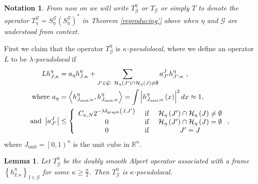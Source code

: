 \documentclass{amsart}%
\theoremstyle{plain}
\newtheorem{lemma}[theorem]{Lemma}
\newtheorem{notation}[theorem]{Notation}
\numberwithin{equation}{section}
\begin{document}
\begin{notation}
From now on we will write $T_{\mathcal{G}}^{\eta}$ or $T_{\mathcal{G}}$ or
simply $T$ to denote the operator $T_{\eta}^{\mathcal{G}}=S_{\eta
}^{\mathcal{G}}\left(  S_{\eta}^{\mathcal{G}}\right)  ^{\ast}$ in Theorem
\ref{reproducing'} above when $\eta$ and $\mathcal{G}$ are understood from context.
\end{notation}

First we claim that the operator $T_{\mathcal{G}}^{\eta}$ is $\kappa
$\emph{-pseudolocal}, where we define an operator $L$ to be $\lambda
$\emph{-pseudolocal }if
\begin{align*}
Lh_{J;\kappa}^{\eta}  & =a_{\eta}h_{J;\kappa}^{\eta}+\sum_{J^{\prime}%
\in\mathcal{G}:\ \mathcal{H}_{\eta}\left(  J^{\prime}\right)  \cap
\mathcal{H}_{\eta}\left(  J\right)  \neq\emptyset}a_{J^{\prime}}%
^{J}h_{J^{\prime};\kappa}^{\eta}\ ,\\
\text{where }a_{\eta}  & =\left\langle h_{J_{\operatorname*{unit}};\kappa
}^{\eta},h_{J_{\operatorname*{unit}};\kappa}^{\eta}\right\rangle
=\int\left\vert h_{J_{\operatorname*{unit}};\kappa}^{\eta}\left(  x\right)
\right\vert ^{2}dx\approx1,\\
\text{and }\left\vert a_{J^{\prime}}^{J}\right\vert  & \leq\left\{
\begin{array}
[c]{ccc}%
C_{\kappa,N}2^{-\lambda\delta_{\operatorname*{graph}}\left(  J,J^{\prime
}\right)  } & \text{ if } & \mathcal{H}_{\eta}\left(  J^{\prime}\right)
\cap\mathcal{H}_{\eta}\left(  J\right)  \neq\emptyset\\
0 & \text{ if } & \mathcal{H}_{\eta}\left(  J^{\prime}\right)  \cap
\mathcal{H}_{\eta}\left(  J\right)  =\emptyset\\
0 & \text{ if } & J^{\prime}=J
\end{array}
\right.  ,
\end{align*}
where $J_{\operatorname*{unit}}=\left[  0,1\right)  ^{n}$ is the unit cube in
$\mathbb{R}^{n}$.

\begin{lemma}
Let $T_{\mathcal{G}}^{\eta}$ be the doubly smooth Alpert operator associated
with a frame $\left\{  h_{I;\kappa}^{\eta}\right\}  _{I\in\mathcal{G}}$ for
some $\kappa\geq\frac{n}{2}$. Then $T_{\mathcal{G}}^{\eta}$ is $\kappa$-pseudolocal.
\end{lemma}
\end{document}
